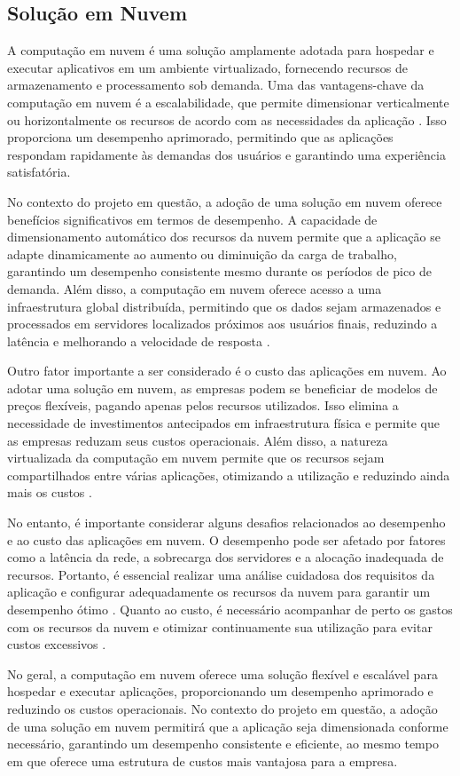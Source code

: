 \subsection{Solução em Nuvem}

A computação em nuvem é uma solução amplamente adotada para hospedar e executar aplicativos em um ambiente virtualizado, fornecendo recursos de armazenamento e processamento sob demanda. Uma das vantagens-chave da computação em nuvem é a escalabilidade, que permite dimensionar verticalmente ou horizontalmente os recursos de acordo com as necessidades da aplicação \cite{fernando2016mobile}. Isso proporciona um desempenho aprimorado, permitindo que as aplicações respondam rapidamente às demandas dos usuários e garantindo uma experiência satisfatória.

No contexto do projeto em questão, a adoção de uma solução em nuvem oferece benefícios significativos em termos de desempenho. A capacidade de dimensionamento automático dos recursos da nuvem permite que a aplicação se adapte dinamicamente ao aumento ou diminuição da carga de trabalho, garantindo um desempenho consistente mesmo durante os períodos de pico de demanda. Além disso, a computação em nuvem oferece acesso a uma infraestrutura global distribuída, permitindo que os dados sejam armazenados e processados em servidores localizados próximos aos usuários finais, reduzindo a latência e melhorando a velocidade de resposta \cite{fernando2016mobile}.

Outro fator importante a ser considerado é o custo das aplicações em nuvem. Ao adotar uma solução em nuvem, as empresas podem se beneficiar de modelos de preços flexíveis, pagando apenas pelos recursos utilizados. Isso elimina a necessidade de investimentos antecipados em infraestrutura física e permite que as empresas reduzam seus custos operacionais. Além disso, a natureza virtualizada da computação em nuvem permite que os recursos sejam compartilhados entre várias aplicações, otimizando a utilização e reduzindo ainda mais os custos \cite{fernando2016mobile}.

No entanto, é importante considerar alguns desafios relacionados ao desempenho e ao custo das aplicações em nuvem. O desempenho pode ser afetado por fatores como a latência da rede, a sobrecarga dos servidores e a alocação inadequada de recursos. Portanto, é essencial realizar uma análise cuidadosa dos requisitos da aplicação e configurar adequadamente os recursos da nuvem para garantir um desempenho ótimo \cite{fernando2016mobile}. Quanto ao custo, é necessário acompanhar de perto os gastos com os recursos da nuvem e otimizar continuamente sua utilização para evitar custos excessivos \cite{fernando2016mobile}.

No geral, a computação em nuvem oferece uma solução flexível e escalável para hospedar e executar aplicações, proporcionando um desempenho aprimorado e reduzindo os custos operacionais. No contexto do projeto em questão, a adoção de uma solução em nuvem permitirá que a aplicação seja dimensionada conforme necessário, garantindo um desempenho consistente e eficiente, ao mesmo tempo em que oferece uma estrutura de custos mais vantajosa para a empresa.
